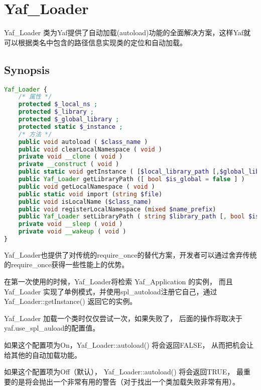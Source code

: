 \chapter{Yaf\_Loader}

Yaf\_Loader 类为Yaf提供了自动加载(autoload)功能的全面解决方案，这样Yaf就可以根据类名中包含的路径信息实现类的定位和自动加载。

\section{Synopsis}


\begin{lstlisting}[language=PHP]
Yaf_Loader {
    /* 属性 */
    protected $_local_ns ;
    protected $_library ;
    protected $_global_library ;
    protected static $_instance ;
    /* 方法 */
    public void autoload ( $class_name )
    public void clearLocalNamespace ( void )
    private void __clone ( void )
    private __construct ( void )
    public static void getInstance ( [$local_library_path [,$global_library_path]] )
    public Yaf_Loader getLibraryPath ([ bool $is_global = false ] )
    public void getLocalNamespace ( void )
    public static void import (string $file)
    public void isLocalName ($class_name)
    public void registerLocalNamespace (mixed $name_prefix)
    public Yaf_Loader setLibraryPath ( string $library_path [, bool $is_global = false ] )
    private void __sleep ( void )
    private void __wakeup ( void )
}
\end{lstlisting}


Yaf\_Loader也提供了对传统的require\_once的替代方案，开发者可以通过舍弃传统的require\_once获得一些性能上的优势。

在第一次使用的时候，Yaf\_Loader将检索 Yaf\_Application 的实例， 而且Yaf\_Loader 实现了单例模式，并使用spl\_autoload注册它自己，通过 Yaf\_Loader::getInstance() 返回它的实例。

Yaf\_Loader 加载一个类时仅仅尝试一次，如果失败了， 后面的操作将取决于yaf.use\_spl\_auload的配置值。

\begin{compactitem}
\item 如果这个配置项为On，Yaf\_Loader::autoload() 将会返回FALSE， 从而把机会让给其他的自动加载功能。
\item 如果这个配置项为Off（默认）， Yaf\_Loader::autoload() 将会返回TRUE， 最重要的是将会抛出一个非常有用的警告（对于找出一个类加载失败非常有用）。
\end{compactitem}

